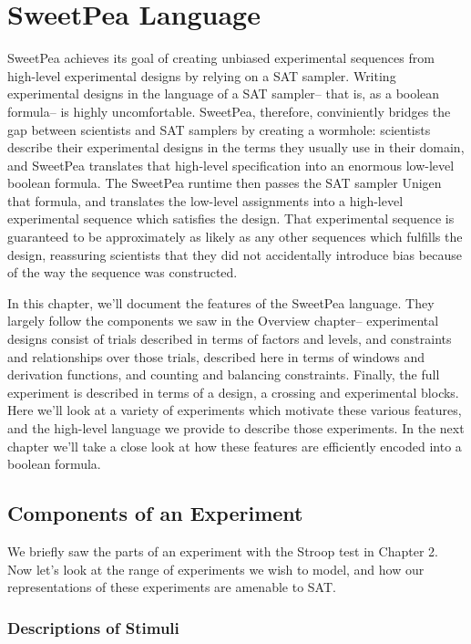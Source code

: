 
\chapter{SweetPea Language}

SweetPea achieves its goal of creating unbiased experimental sequences from high-level experimental designs by relying on a SAT sampler. Writing experimental designs in the language of a SAT sampler-- that is, as a boolean formula-- is highly uncomfortable. SweetPea, therefore, conviniently bridges the gap between scientists and SAT samplers by creating a wormhole: scientists describe their experimental designs in the terms they usually use in their domain, and SweetPea translates that high-level specification into an enormous low-level boolean formula. The SweetPea runtime then passes the SAT sampler Unigen that formula, and translates the low-level assignments into a high-level experimental sequence which satisfies the design. That experimental sequence is guaranteed to be approximately as likely as any other sequences which fulfills the design, reassuring scientists that they did not accidentally introduce bias because of the way the sequence was constructed.

In this chapter, we'll document the features of the SweetPea language. They largely follow the components we saw in the Overview chapter-- experimental designs consist of trials described in terms of factors and levels, and constraints and relationships over those trials, described here in terms of windows and derivation functions, and counting and balancing constraints. Finally, the full experiment is described in terms of a design, a crossing and experimental blocks. Here we'll look at a variety of experiments which motivate these various features, and the high-level language we provide to describe those experiments. In the next chapter we'll take a close look at how these features are efficiently encoded into a boolean formula.


\section{Components of an Experiment}

We briefly saw the parts of an experiment with the Stroop test in Chapter 2. Now let's look at the range of experiments we wish to model, and how our representations of these experiments are amenable to SAT.

\subsection{Descriptions of Stimuli}

